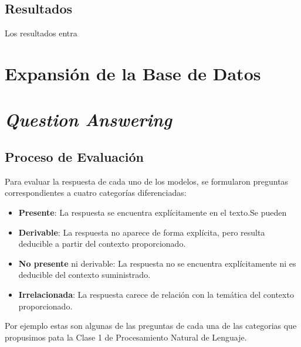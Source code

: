 \subsection{Resultados}
\label{subsection:6-1-Resultados}
Los resultados entra


\section{Expansión de la Base de Datos}
\label{section:6-2-Expansión de la Base de Datos}


\section{\textit{Question Answering}}
\label{section:6-2-Question Answering}

\subsection{Proceso de Evaluación}
Para evaluar la respuesta de cada uno de los modelos, se formularon preguntas correspondientes a cuatro categorías diferenciadas:

\begin{itemize}
    \item \textbf{Presente}: La respuesta se encuentra explícitamente en el texto.Se pueden 
    \item \textbf{Derivable}: La respuesta no aparece de forma explícita, pero resulta deducible a partir del \gls{contexto} proporcionado.
    \item \textbf{No presente} ni derivable: La respuesta no se encuentra explícitamente ni es deducible del \gls{contexto} suministrado.
    \item \textbf{Irrelacionada}: La respuesta carece de relación con la temática del \gls{contexto} proporcionado.
\end{itemize}

Por ejemplo estas son algunas de las preguntas de cada una de las categorias que propusimos pata la Clase 1 de Procesamiento Natural de Lenguaje.

